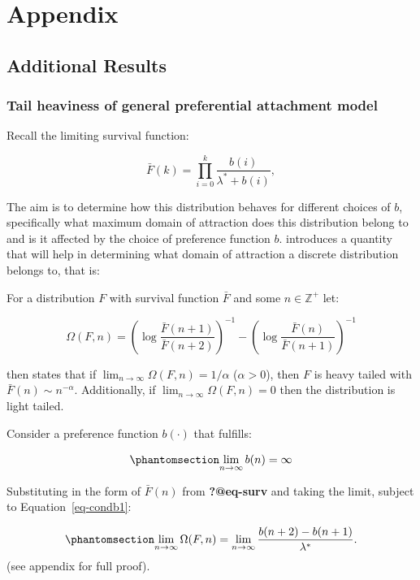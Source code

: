 \documentclass[
  sn-basic,
]{sn-jnl}
\theoremstyle{plain}
\theoremstyle{remark}
\begin{document}
\section{Appendix}\label{appendix}

\subsection{Additional Results}\label{additional-results}

\subsubsection{Tail heaviness of general preferential attachment
model}\label{tail-heaviness-of-general-preferential-attachment-model}

Recall the limiting survival function:

\[
\bar F(k) = \prod_{i=0}^k \frac{b(i)}{\lambda^*+b(i)},
\]

The aim is to determine how this distribution behaves for different
choices of \(b\), specifically what maximum domain of attraction does
this distribution belong to and is it affected by the choice of
preference function \(b\). \citet{shimura12} introduces a quantity that
will help in determining what domain of attraction a discrete
distribution belongs to, that is:

For a distribution \(F\) with survival function \(\bar F\) and some
\(n\in\mathbb Z^+\) let:

\[
\Omega(F,n) = \left(\log\displaystyle\frac{\bar F (n+1)}{\bar F (n+2)}\right)^{-1} - \left(\log\displaystyle\frac{\bar F (n)}{\bar F (n+1)}\right)^{-1}
\]

\citep{shimura12} then states that if
\(\lim_{n\rightarrow\infty} \Omega(F,n) = 1/\alpha\) (\(\alpha>0\)),
then \(F\) is heavy tailed with \(\bar F(n) \sim n^{-\alpha}\).
Additionally, if \(\lim_{n\rightarrow\infty} \Omega(F,n) = 0\) then the
distribution is light tailed.

Consider a preference function \(b(\cdot)\) that fulfills:

\begin{equation}\phantomsection\label{eq-condb1}{
\lim_{n\rightarrow \infty} b(n) = \infty
}\end{equation}

Substituting in the form of \(\bar F(n)\) from \textbf{?@eq-surv} and
taking the limit, subject to Equation~\ref{eq-condb1}:

\begin{equation}\phantomsection\label{eq-omegares}{
\lim_{n\rightarrow\infty}\Omega(F,n) = \lim_{n\rightarrow\infty}\frac{b(n+2)-b(n+1)}{\lambda^*}.
}\end{equation} (see appendix for full proof).
\end{document}
